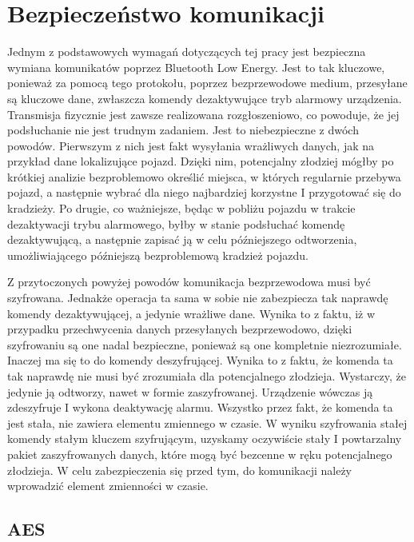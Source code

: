 \chapter{Bezpieczeństwo komunikacji}
\label{ch:communication security}

Jednym z podstawowych wymagań dotyczących tej pracy jest bezpieczna wymiana komunikatów poprzez Bluetooth Low Energy. Jest to tak kluczowe, ponieważ za pomocą tego protokołu, poprzez bezprzewodowe medium, przesyłane są kluczowe dane, zwłaszcza komendy dezaktywujące tryb alarmowy urządzenia. Transmisja fizycznie jest zawsze realizowana rozgłoszeniowo, co powoduje, że jej podsłuchanie nie jest trudnym zadaniem. Jest to niebezpieczne z dwóch powodów. Pierwszym z nich jest fakt wysyłania wrażliwych danych, jak na przykład dane lokalizujące pojazd. Dzięki nim, potencjalny złodziej mógłby po krótkiej analizie bezproblemowo określić miejsca, w których regularnie przebywa pojazd, a następnie wybrać dla niego najbardziej korzystne I przygotować się do kradzieży. Po drugie, co ważniejsze, będąc w pobliżu pojazdu w trakcie dezaktywacji trybu alarmowego, byłby w stanie podsłuchać komendę dezaktywującą, a następnie zapisać ją w celu późniejszego odtworzenia, umożliwiającego późniejszą bezproblemową kradzież pojazdu.

Z przytoczonych powyżej powodów komunikacja bezprzewodowa musi być szyfrowana. Jednakże operacja ta sama w sobie nie zabezpiecza tak naprawdę komendy dezaktywującej, a jedynie wrażliwe dane. Wynika to z faktu, iż w przypadku przechwycenia danych przesyłanych bezprzewodowo, dzięki szyfrowaniu są one nadal bezpieczne, ponieważ są one kompletnie niezrozumiałe. Inaczej ma się to do komendy deszyfrującej. Wynika to z faktu, że komenda ta tak naprawdę nie musi być zrozumiała dla potencjalnego złodzieja. Wystarczy, że jedynie ją odtworzy, nawet w formie zaszyfrowanej. Urządzenie wówczas ją zdeszyfruje I wykona deaktywację alarmu. Wszystko przez fakt, że komenda ta jest stała, nie zawiera elementu zmiennego w czasie. W wyniku szyfrowania stałej komendy stałym kluczem szyfrującym, uzyskamy oczywiście stały I powtarzalny pakiet zaszyfrowanych danych, które mogą być bezcenne w ręku potencjalnego złodzieja. W celu zabezpieczenia się przed tym, do komunikacji należy wprowadzić element zmienności w czasie.  

\section{AES}

